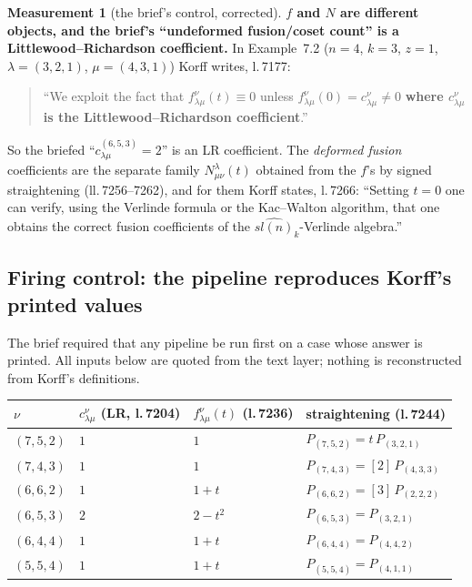 \documentclass[11pt]{article}
\theoremstyle{plain}
\theoremstyle{definition}
\newtheorem{measurement}[theorem]{Measurement}
\begin{document}
\begin{measurement}[the brief's control, corrected]\label{m:fvsN}
\textbf{$f$ and $N$ are different objects, and the brief's ``undeformed fusion/coset count''
is a Littlewood--Richardson coefficient.} In Example~7.2 ($n=4$, $k=3$, $z=1$,
$\lambda=(3,2,1)$, $\mu=(4,3,1)$) Korff writes, l.\,7177:
\begin{quote}\small
``We exploit the fact that $f^\nu_{\lambda\mu}(t)\equiv 0$ unless
$f^\nu_{\lambda\mu}(0)=c^\nu_{\lambda\mu}\neq 0$ \textbf{where $c^\nu_{\lambda\mu}$ is the
Littlewood--Richardson coefficient}.''
\end{quote}
So the briefed ``$c^{(6,5,3)}_{\lambda\mu}=2$'' is an LR coefficient. The
\emph{deformed fusion} coefficients are the separate family
$N^\lambda_{\mu\nu}(t)$ obtained from the $f$'s by signed straightening
(ll.\,7256--7262), and for them Korff states, l.\,7266: ``Setting $t=0$ one can verify,
using the Verlinde formula or the Kac--Walton algorithm, that one obtains the correct fusion
coefficients of the $\widehat{sl(n)}_k$-Verlinde algebra.''
\end{measurement}

\subsection{Firing control: the pipeline reproduces Korff's printed values}

The brief required that any pipeline be run first on a case whose answer is printed. All
inputs below are quoted from the text layer; nothing is reconstructed from Korff's
definitions.

\begin{center}\small
\begin{tabular}{@{}llll@{}}
\toprule
$\nu$ & $c^\nu_{\lambda\mu}$ (LR, l.\,7204) & $f^\nu_{\lambda\mu}(t)$ (l.\,7236) & straightening (l.\,7244) \\
\midrule
$(7,5,2)$ & $1$ & $1$     & $P_{(7,5,2)}=t\,P_{(3,2,1)}$ \\
$(7,4,3)$ & $1$ & $1$     & $P_{(7,4,3)}=[2]\,P_{(4,3,3)}$ \\
$(6,6,2)$ & $1$ & $1+t$   & $P_{(6,6,2)}=[3]\,P_{(2,2,2)}$ \\
$(6,5,3)$ & $2$ & $2-t^2$ & $P_{(6,5,3)}=P_{(3,2,1)}$ \\
$(6,4,4)$ & $1$ & $1+t$   & $P_{(6,4,4)}=P_{(4,4,2)}$ \\
$(5,5,4)$ & $1$ & $1+t$   & $P_{(5,5,4)}=P_{(4,1,1)}$ \\
\bottomrule
\end{tabular}
\end{center}
\end{document}
